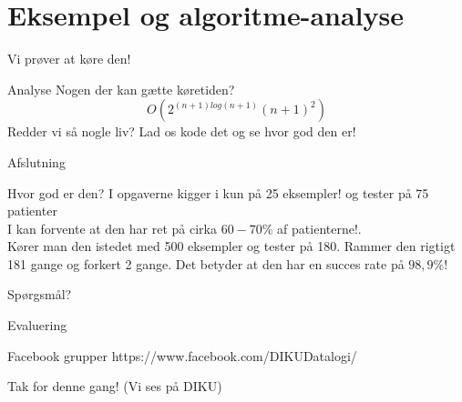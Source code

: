\documentclass[12pt,t]{beamer}
\begin{document}
\section{Eksempel og algoritme-analyse}
\frame{\tableofcontents[currentsection]}
    \begin{frame}[t]{Vi prøver at køre den!}
        \begin{block}{Analyse}
            Nogen der kan gætte køretiden? \pause
            $$
                O(2^{(n+1) log(n+1)} (n + 1)^2)
            $$
                \pause
                Redder vi så nogle liv?
                \pause
                Lad os kode det og se hvor god den er!
            \end{block}
    \end{frame}

    \begin{frame}[t]{Afslutning}
    \begin{block}{Hvor god er den? }
        I opgaverne kigger i kun på \alert{25 eksempler!} og tester på 75
        patienter \\
        \pause
        I kan forvente at den har ret på cirka $60-70\%$ af patienterne!.\\
        \pause
        Kører man den istedet med 500 eksempler og tester på 180. \pause
        Rammer den rigtigt 181 gange og forkert 2 gange. Det betyder at den
        har en succes rate på \alert{$98,9\%$!}
    \end{block}
    \pause
    \centering Spørgsmål?\\
    \end{frame}

    \begin{frame}[c]{Evaluering}
    \begin{block}{Facebook grupper}
        \centering
        https://www.facebook.com/DIKUDatalogi/ \\
    \end{block}
    \pause Tak for denne gang! (Vi ses på DIKU)
    \end{frame}
\end{document}
